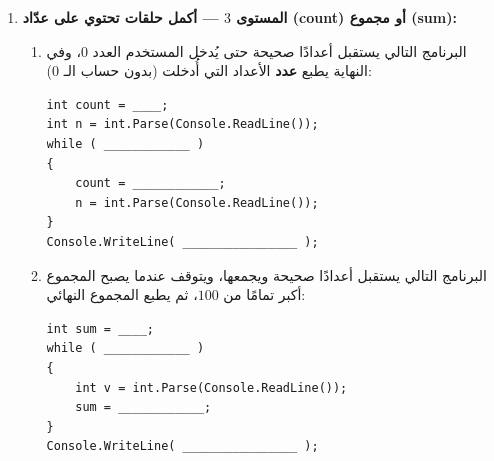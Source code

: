 \documentclass[14pt]{extarticle}
\begin{document}
\begin{enumerate}[resume, itemsep=2em]
\begin{enumerate}
    \item البرنامج التالي يستقبل كلمة المرور (عدد صحيح)، وطالما كانت غير مطابقة لكلمة المرور الصحيحة $8264$ يطلب إدخالها من جديد، وفي النهاية يطبع \textenglish{"Welcome"}:
\begin{boxCode}
\begin{english}
\begin{verbatim}
int pass = int.Parse(Console.ReadLine());
while ( ____________ )
{
    Console.WriteLine("Wrong password, try again:");
    ____________________________________;
}
Console.WriteLine("Welcome");
\end{verbatim}
\end{english}
\end{boxCode}
\end{enumerate}
\ifwithsols
\begin{boxSolution}
\begin{english}
\begin{verbatim}
// a
int n = int.Parse(Console.ReadLine());
while (n % 7 != 0)
{
    n = int.Parse(Console.ReadLine());
}
Console.WriteLine(n);

// b
int pass = int.Parse(Console.ReadLine());
while (pass != 8264)
{
    Console.WriteLine("Wrong password, try again:");
    pass = int.Parse(Console.ReadLine());
}
Console.WriteLine("Welcome");
\end{verbatim}
\end{english}
\end{boxSolution}
\fi
\filbreak

\item \textbf{المستوى $3$ — أكمل حلقات تحتوي على عدّاد (\textenglish{count}) أو مجموع (\textenglish{sum}):}
\begin{enumerate}
    \item البرنامج التالي يستقبل أعدادًا صحيحة حتى يُدخل المستخدم العدد $0$، وفي النهاية يطبع \textbf{عدد} الأعداد التي أُدخلت (بدون حساب الـ $0$):
\begin{boxCode}
\begin{english}
\begin{verbatim}
int count = ____;
int n = int.Parse(Console.ReadLine());
while ( ____________ )
{
    count = ____________;
    n = int.Parse(Console.ReadLine());
}
Console.WriteLine( ________________ );
\end{verbatim}
\end{english}
\end{boxCode}

    \item البرنامج التالي يستقبل أعدادًا صحيحة ويجمعها، ويتوقف عندما يصبح المجموع أكبر تمامًا من $100$، ثم يطبع المجموع النهائي:
\begin{boxCode}
\begin{english}
\begin{verbatim}
int sum = ____;
while ( ____________ )
{
    int v = int.Parse(Console.ReadLine());
    sum = ____________;
}
Console.WriteLine( ________________ );
\end{verbatim}
\end{english}
\end{boxCode}


\end{enumerate}
\end{enumerate}
\end{document}
